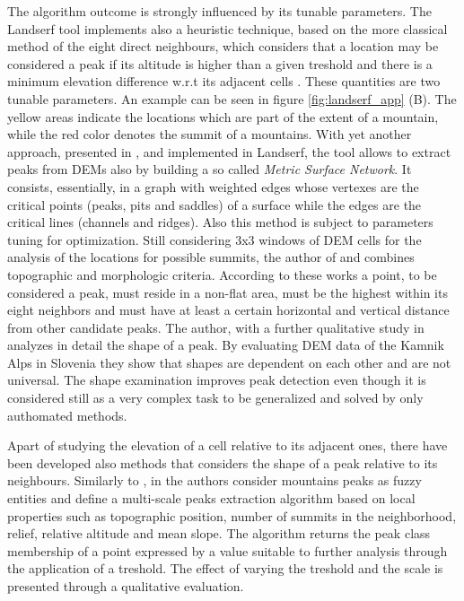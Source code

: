 The algorithm outcome is strongly influenced by its tunable parameters. The Landserf tool implements also a heuristic technique, based on the more classical method of the eight direct neighbours, which considers that a location may be considered a peak if its altitude is higher than a given treshold and there is a minimum elevation difference w.r.t its adjacent cells \cite{wood2009geomorphometry}. These quantities are two tunable parameters. An example can be seen in figure \ref{fig:landserf_app} (B). The yellow areas indicate the locations which are part of the extent of a mountain, while the red color denotes the summit of a mountains. With yet another approach, presented in \cite{schneiderWood}, and implemented in Landserf, the tool allows to extract peaks from DEMs also by building a so called \textit{Metric Surface Network}. It consists, essentially, in a graph with weighted edges whose vertexes are the critical points (peaks, pits and saddles) of a surface while the edges are the critical lines (channels and ridges). Also this method is subject to parameters tuning for optimization. Still considering 3x3 windows of DEM cells for the analysis of the locations for possible summits, the author of \cite{podobnikar2009method} and \cite{podobnikar2010mountains} combines topographic and morphologic criteria. According to these works a point, to be considered a peak, must reside in a non-flat area, must be the highest within its eight neighbors and must have at least a certain horizontal and vertical distance from other candidate peaks. The author, with a further qualitative study in \cite{podobnikar2012detecting} analyzes in detail the shape of a peak. By evaluating DEM data of the Kamnik Alps in Slovenia they show that shapes are dependent on each other and are not universal. The shape examination improves peak detection even though it is considered still as a very complex task to be generalized and solved by only authomated methods. 

Apart of studying the elevation of a cell relative to its adjacent ones, there have been developed also methods that considers the shape of a peak relative to its neighbours. Similarly to \cite{fisher2004helvellyn}, in \cite{deng2008multi} the authors consider mountains peaks as fuzzy entities and define a multi-scale peaks extraction algorithm based on local properties such as topographic position, number of summits in the neighborhood, relief, relative altitude and mean slope. The algorithm returns the peak class membership of a point expressed by a value suitable to further analysis through the application of a treshold. The effect of varying the treshold and the scale is presented through a qualitative evaluation. 

